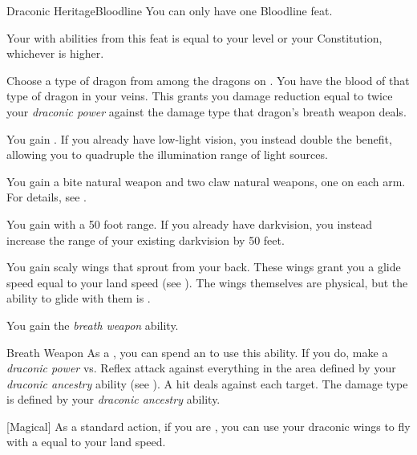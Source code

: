     \begin{feat}{Draconic Heritage}{Bloodline}
         You can only have one Bloodline feat.

         Your  with abilities from this feat is equal to your level or your Constitution, whichever is higher.

         Choose a type of dragon from among the dragons on .
        You have the blood of that type of dragon in your veins.
        This grants you damage reduction equal to twice your \textit{draconic power} against the damage type that dragon's breath weapon deals.

         You gain .
        If you already have low-light vision, you instead double the benefit, allowing you to quadruple the illumination range of light sources.

         You gain a bite natural weapon and two claw natural weapons, one on each arm.
        For details, see .

         You gain  with a 50 foot range.
        If you already have darkvision, you instead increase the range of your existing darkvision by 50 feet.

         You gain scaly wings that sprout from your back.
        These wings grant you a glide speed equal to your land speed (see ).
        The wings themselves are physical, but the ability to glide with them is .

         You gain the \textit{breath weapon} ability.
        \begin{ability}{Breath Weapon}
            As a , you can spend an  to use this ability.
            If you do, make a \textit{draconic power} vs. Reflex attack against everything in the area defined by your \textit{draconic ancestry} ability (see ).
            A hit deals  against each target.
            The damage type is defined by your \textit{draconic ancestry} ability.
        \end{ability}

        [Magical] 
        As a standard action, if you are , you can use your draconic wings to fly with a  equal to your land speed.


\end{feat}
